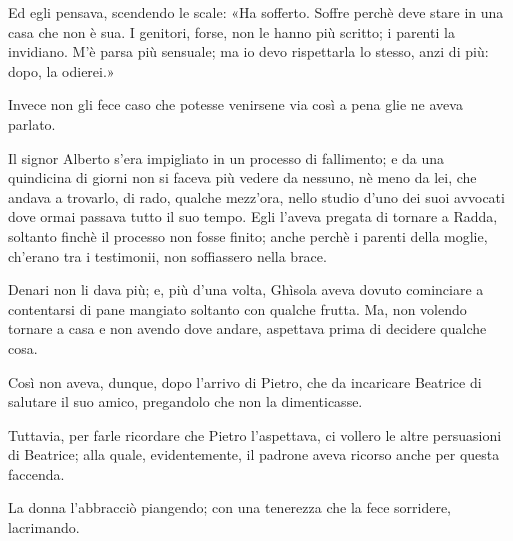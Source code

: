 Ed egli pensava, scendendo le scale: «Ha sofferto. Soffre perchè deve stare in una casa che non è sua. I genitori, forse, non le hanno più scritto; i parenti la invidiano. M’è parsa più sensuale; ma io devo rispettarla lo stesso, anzi di più: dopo, la odierei.»

Invece non gli fece caso che potesse venirsene via così a pena glie ne aveva parlato.

Il signor Alberto s’era impigliato in un processo di fallimento; e da una quindicina di giorni non si faceva più vedere da nessuno, nè meno da lei, che andava a trovarlo, di rado, qualche mezz’ora, nello studio d’uno dei suoi avvocati dove ormai passava tutto il suo tempo. Egli l’aveva pregata di tornare a Radda, soltanto finchè il processo non fosse finito; anche perchè i parenti della moglie, ch’erano tra i testimonii, non soffiassero nella brace.

Denari non li dava più; e, più d’una volta, Ghìsola aveva dovuto cominciare a contentarsi di pane mangiato soltanto con qualche frutta. Ma, non volendo tornare a casa e non avendo dove andare, aspettava prima di decidere qualche cosa.

Così non aveva, dunque, dopo l’arrivo di Pietro, che da incaricare Beatrice di salutare il suo amico, pregandolo che non la dimenticasse.

Tuttavia, per farle ricordare che Pietro l’aspettava, ci vollero le altre persuasioni di Beatrice; alla quale, evidentemente, il padrone aveva ricorso anche per questa faccenda.

La donna l’abbracciò piangendo; con una tenerezza che la fece sorridere, lacrimando.
